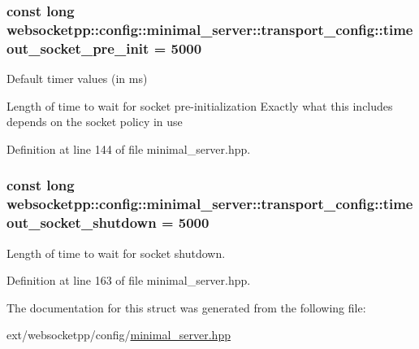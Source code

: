 \subsubsection[{timeout\+\_\+socket\+\_\+pre\+\_\+init}]{\setlength{\rightskip}{0pt plus 5cm}const long websocketpp\+::config\+::minimal\+\_\+server\+::transport\+\_\+config\+::timeout\+\_\+socket\+\_\+pre\+\_\+init = 5000\hspace{0.3cm}{\ttfamily [static]}}\label{structwebsocketpp_1_1config_1_1minimal__server_1_1transport__config_abe0f95c0e47d16ff3b316910fed6e5f1}


Default timer values (in ms) 

Length of time to wait for socket pre-\/initialization Exactly what this includes depends on the socket policy in use 

Definition at line 144 of file minimal\+\_\+server.\+hpp.

\hypertarget{structwebsocketpp_1_1config_1_1minimal__server_1_1transport__config_a100202545acd0d397d0462eb87e61b6c}{}
\subsubsection[{timeout\+\_\+socket\+\_\+shutdown}]{\setlength{\rightskip}{0pt plus 5cm}const long websocketpp\+::config\+::minimal\+\_\+server\+::transport\+\_\+config\+::timeout\+\_\+socket\+\_\+shutdown = 5000\hspace{0.3cm}{\ttfamily [static]}}\label{structwebsocketpp_1_1config_1_1minimal__server_1_1transport__config_a100202545acd0d397d0462eb87e61b6c}


Length of time to wait for socket shutdown. 



Definition at line 163 of file minimal\+\_\+server.\+hpp.



The documentation for this struct was generated from the following file\+:\begin{DoxyCompactItemize}
\item 
ext/websocketpp/config/\hyperlink{minimal__server_8hpp}{minimal\+\_\+server.\+hpp}\end{DoxyCompactItemize}
